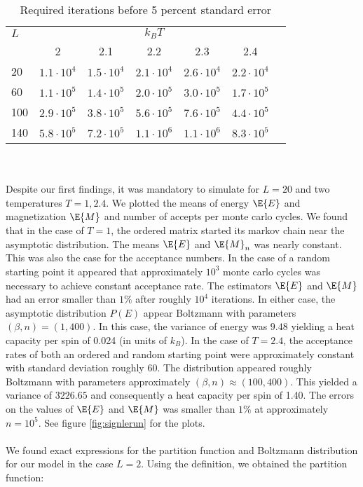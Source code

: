 \documentclass[11pt,english,a4paper]{article}
\begin{document}
\begin{table}[!h]
\center
\begin{tabular}{l c c c c c c}
$L$ & \multicolumn{5}{c}{$k_BT$} \\
		&2					&2.1			&2.2			&2.3			&2.4\\
\hline
20  	&$1.1\cdot 10^4$	&$1.5\cdot 10^4$&$2.1\cdot 10^4$&$2.6\cdot 10^4$&$2.2\cdot 10^4$\\
60		&$1.1\cdot 10^5$	&$1.4\cdot 10^5$&$2.0\cdot 10^5$&$3.0\cdot 10^5$&$1.7\cdot 10^5$\\
100		&$2.9\cdot 10^5$	&$3.8\cdot 10^5$&$5.6\cdot 10^5$&$7.6\cdot 10^5$&$4.4\cdot 10^5$\\
140		&$5.8\cdot 10^5$	&$7.2\cdot 10^5$&$1.1\cdot 10^6$&$1.1\cdot 10^6$&$8.3\cdot 10^5$
\end{tabular}
\caption{Required iterations before 5 percent standard error} \label{tab:standardError}
\end{table}%
\\
\\
Despite our first findings, it was mandatory to simulate for $L=20$ and two temperatures $T=1, 2.4$. We plotted the means of energy $\E{E}$ and magnetization $\E{M}$ and number of accepts per monte carlo cycles. We found that in the case of $T=1$, the ordered matrix started its markov chain near the asymptotic distribution. The means $\E{E}$ and $\E{M}_n$ was nearly constant. This was also the case for the acceptance numbers. In the case of a random starting point it appeared that approximately $10^3$ monte carlo cycles was necessary to achieve constant acceptance rate. The estimators $\E{E}$ and $\E{M}$ had an error smaller than $1\%$ after roughly $10^4$ iterations. In either case, the asymptotic distribution $P(E)$ appear Boltzmann with parameters $(\beta,n) = (1,400)$. In this case, the variance of energy was $9.48$ yielding a heat capacity per spin of 0.024 (in units of $k_B$).
In the case of $T = 2.4$, the acceptance rates of both an ordered and random starting point were approximately constant with standard deviation roughly 60. The distribution appeared roughly Boltzmann with parameters approximately $(\beta,n) \approx (100,400)$. This yielded a variance of $3226.65$ and consequently a heat capacity per spin of 1.40. The errors on the values of $\E{E}$ and $\E{M}$ was smaller than $1 \%$ at approximately $n = 10^5$. See figure \ref{fig:signlerun} for the plots.\\
\\
We found exact expressions for the partition function and Boltzmann distribution for our model in the case $L=2$. Using the definition, we obtained the partition function:
\end{document}
